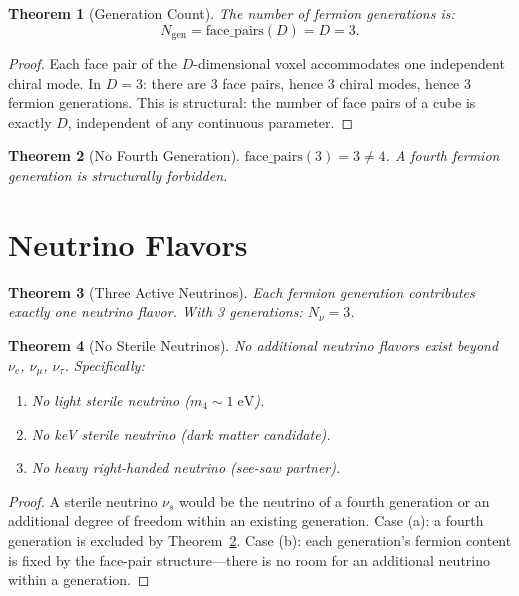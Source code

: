 \documentclass[12pt,a4paper]{article}
\newtheorem{theorem}{Theorem}[section]
\theoremstyle{definition}
\theoremstyle{remark}
\begin{document}
\begin{theorem}[Generation Count]
\label{thm:gen-count}
The number of fermion generations is:
\begin{equation}
  \boxed{N_{\mathrm{gen}} = \mathrm{face\_pairs}(D) = D = 3.}
\end{equation}
\end{theorem}

\begin{proof}
Each face pair of the $D$-dimensional voxel accommodates one
independent chiral mode.  In $D = 3$: there are 3 face pairs,
hence 3 chiral modes, hence 3 fermion generations.  This is
structural: the number of face pairs of a cube is exactly $D$,
independent of any continuous parameter.
\end{proof}

\begin{theorem}[No Fourth Generation]
\label{thm:no-fourth}
$\mathrm{face\_pairs}(3) = 3 \neq 4$.  A fourth fermion
generation is structurally forbidden.
\end{theorem}

\section{Neutrino Flavors}
\label{sec:flavors}

\begin{theorem}[Three Active Neutrinos]
Each fermion generation contributes exactly one neutrino flavor.
With 3 generations: $N_\nu = 3$.
\end{theorem}

\begin{theorem}[No Sterile Neutrinos]
\label{thm:no-sterile}
No additional neutrino flavors exist beyond $\nu_e$, $\nu_\mu$,
$\nu_\tau$.  Specifically:
\begin{enumerate}[label=(\roman*)]
  \item No light sterile neutrino ($m_4 \sim 1\;\mathrm{eV}$).
  \item No keV sterile neutrino (dark matter candidate).
  \item No heavy right-handed neutrino (see-saw partner).
\end{enumerate}
\end{theorem}

\begin{proof}
A sterile neutrino $\nu_s$ would be the neutrino of a fourth
generation or an additional degree of freedom within an existing
generation.  Case (a): a fourth generation is excluded by
Theorem~\ref{thm:no-fourth}.  Case (b): each generation's fermion
content is fixed by the face-pair structure---there is no room for
an additional neutrino within a generation.
\end{proof}
\end{document}
